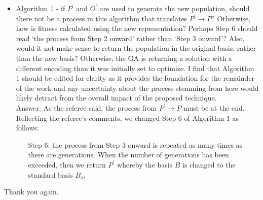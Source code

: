 \documentclass[a4paper]{article}
\newenvironment*{qna}{%
	\newcommand{\comment}{\item \sf}%
	\newcommand{\answer}{\medskip\\Answer: \rm}%
	\newcommand*{\quotehead}{\medskip\par\rm}%
	\newcommand*{\quotetail}{\par\it}%
	\newcommand{\quoteit}{\medskip\par\it}%
	\begin{itemize}%
	}{%
	\end{itemize}\normalfont%
}
\begin{document}
\begin{qna}
\comment 
	Algorithm 1 - if $ P^\prime $ and $ O^\prime $ are used to generate the new
	population, should there not be a process in this algorithm that translates
	$ P^\prime \to P $? Otherwise, how is fitness calculated using the new
	representation? Perhaps Step 6 should read `the process from Step 2 onward'
	rather than `Step 3 onward'? Also, would it not make sense to return the
	population in the original basis, rather than the new basis? Otherwise, the
	GA is returning a solution with a different encoding than it was initially
	set to optimize. I find that Algorithm 1 should be edited for clarity as it
	provides the foundation for the remainder of the work and any uncertainty
	about the process stemming from here would likely detract from the overall
	impact of the proposed technique.
\answer
	As the referee said, the process from $ P^\prime \to P $ must be at the end. Reflecting the referee's comments, we changed Step 6 of Algorithm 1 as follows:
\quoteit
\begin{itemize}
	\item[Step 6:] the process from Step 3 onward is repeated as many times as there are generations. When the number of generations has been exceeded, then
	we return $ P^\prime $ whereby the basis $ B $ is changed to the standard basis $ B_s $.
\end{itemize}
\end{qna}


Thank you again.
\end{document}
